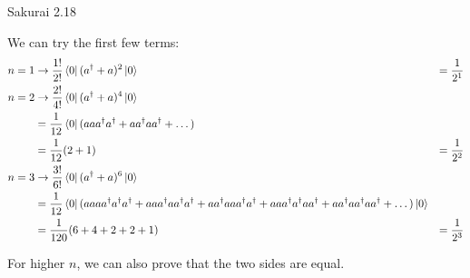 \documentclass{article}
\begin{document}
\begin{section}{Sakurai 2.18}
\begin{tcolorbox}[breakable]
	We can try the first few terms:
	\begin{align*}
		n=1 & \to \frac{1!}{2!} \bra{0} (a^\dagger + a)^{2} \ket{0}                              & = \frac{1}{2^1} \\
		n=2 & \to \frac{2!}{4!} \bra{0} (a^\dagger + a)^{4} \ket{0}                                                \\
		    & = \frac{1}{12} \bra{0} (a a a^\dagger a^\dagger + a a^\dagger a a^\dagger + \dots)                   \\
		    & = \frac{1}{12} (2 + 1)
		    & = \frac{1}{2^2}                                                                                      \\
		n=3 & \to \frac{3!}{6!} \bra{0} (a^\dagger + a)^{6} \ket{0}                                                \\
		    & = \frac{1}{12} \bra{0} (
		a a a a^\dagger a^\dagger a^\dagger +
		a a a^\dagger a a^\dagger a^\dagger +
		a a^\dagger a a a^\dagger a^\dagger +
		a a a^\dagger a^\dagger a a^\dagger +
		a a^\dagger a a^\dagger a a^\dagger + \dots ) \ket{0}                                                      \\
		    & = \frac{1}{120} (6 + 4 + 2 + 2 + 1)
		    & = \frac{1}{2^3}
	\end{align*}

	For higher $n$, we can also prove that the two sides are equal.
\end{tcolorbox}
\end{section}
\end{document}

